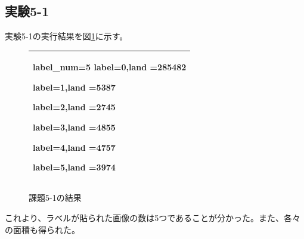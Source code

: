 \documentclass{jarticle}[2012/05/15]
\begin{document}
\subsection{実験5-1}
実験5-1の実行結果を図\ref{kadai05-1}に示す。\par
\begin{figure}[h]
  \begin{center}
    \begin{tabular}{|p{8cm}|}\hline
label\_num=5
label=0,land =285482 \par
label=1,land =5387 \par
label=2,land =2745 \par
label=3,land =4855 \par
label=4,land =4757 \par
label=5,land =3974 \\ \hline
    \end{tabular}
    \caption{課題5-1の結果} \label{kadai05-1}
  \end{center}
\end{figure}
これより、ラベルが貼られた画像の数は5つであることが分かった。また、各々の面積も得られた。
\pagebreak
\end{document}
